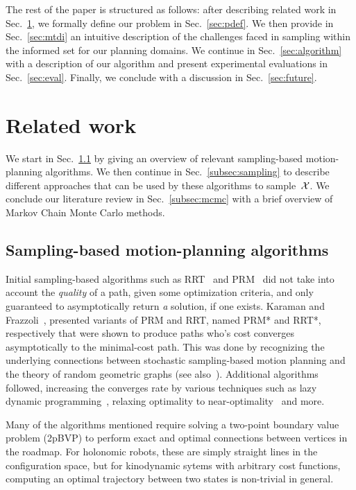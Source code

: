 \documentclass[letterpaper, 10 pt, conference]{ieeeconf}  %
\begin{document}
The rest of the paper is structured as follows: after describing related work in Sec.~\ref{sec:related_work}, we formally define our problem in Sec.~\ref{sec:pdef}.
We then provide in Sec.~\ref{sec:mtdi} an intuitive description of the challenges faced in sampling within the informed set for our planning domains.
We continue in Sec.~\ref{sec:algorithm} with a description of our algorithm and present experimental evaluations in Sec.~\ref{sec:eval}.
Finally, we conclude with a discussion in Sec.~\ref{sec:future}.


\section{Related work}
\label{sec:related_work}
We start in Sec.~\ref{subsec:planning} by giving an overview of relevant sampling-based motion-planning algorithms.
We then continue in Sec.~\ref{subsec:sampling} to describe different approaches that can be used by  these algorithms to sample~$\mathcal{X}$.
We conclude our literature review in Sec.~\ref{subsec:mcmc} with a brief overview of Markov Chain Monte Carlo methods.

\subsection{Sampling-based motion-planning algorithms}
\label{subsec:planning}
Initial sampling-based algorithms such as RRT~\cite{LK01} and PRM~\cite{KSLO96} did not take into account the \emph{quality} of a path, given some optimization criteria, and only guaranteed to asymptotically return \emph{a} solution, if one exists.
Karaman and Frazzoli~\cite{KF11}, presented variants of PRM and RRT, named PRM* and RRT*, respectively that were shown to produce paths who's cost converges asymptotically to the minimal-cost path.
This was done by recognizing the underlying connections between stochastic sampling-based motion planning and the theory of random geometric graphs (see also~\cite{SSH16}).
Additional algorithms followed, increasing the converges rate by various techniques such as 
lazy dynamic programming~\cite{GSB15,SH15},
relaxing optimality to near-optimality~\cite{DB14,SH16} 
and more.

Many of the algorithms mentioned require solving a two-point boundary value problem (2pBVP) to perform exact and optimal connections between vertices in the roadmap.
For holonomic robots, these are simply straight lines in the configuration space, but for kinodynamic sytems with arbitrary cost functions,  computing an optimal trajectory between two states is non-trivial in general.
\end{document}
